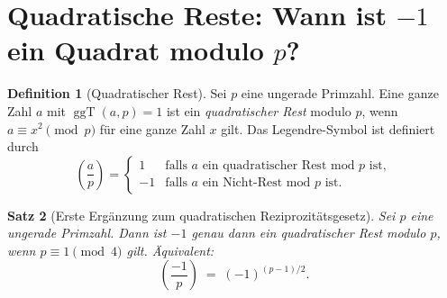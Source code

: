 \documentclass[12pt,a4paper]{amsart}
\newtheorem{theorem}{Satz}[section]
\theoremstyle{definition}
\newtheorem{definition}[theorem]{Definition}
\DeclareMathOperator{\ggT}{ggT}
\newcommand{\leg}[2]{\left(\frac{#1}{#2}\right)}
\begin{document}
\section{Quadratische Reste: Wann ist $-1$ ein Quadrat modulo $p$?}

\begin{definition}[Quadratischer Rest]\label{def:quadratischer_rest}
  Sei $p$ eine ungerade Primzahl. Eine ganze Zahl $a$ mit $\ggT(a,p) = 1$
  ist ein \emph{quadratischer Rest} modulo $p$, wenn $a \equiv x^2 \pmod{p}$
  für eine ganze Zahl $x$ gilt. Das Legendre-Symbol ist definiert durch
  \[
    \leg{a}{p} =
    \begin{cases}
      1  & \text{falls } a \text{ ein quadratischer Rest mod } p \text{ ist}, \\
      -1 & \text{falls } a \text{ ein Nicht-Rest mod } p \text{ ist.}
    \end{cases}
  \]
\end{definition}

\begin{theorem}[Erste Ergänzung zum quadratischen Reziprozitätsgesetz]%
  \label{satz:minus1_qr}
  Sei $p$ eine ungerade Primzahl. Dann ist $-1$ genau dann ein quadratischer
  Rest modulo $p$, wenn $p \equiv 1 \pmod{4}$ gilt. Äquivalent:
  \[
    \leg{-1}{p} \;=\; (-1)^{(p-1)/2}.
  \]
\end{theorem}
\end{document}
